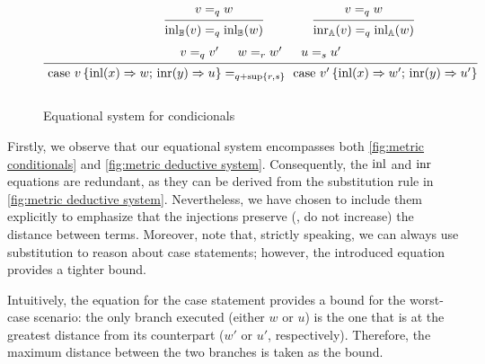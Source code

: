 \begin{figure}[H]
  \begin{equation*}
    \hspace{90pt}
            \begin{prooftree}
                    \hypo{ v =_q w}
                    \infer1[]{\inl_\typeB(v) =_q \inl_\typeB(w)}
            \end{prooftree}
            \hspace{40pt}
            \begin{prooftree}
                    \hypo{ v =_q w}
                    \infer1[]{\inr_\typeA(v) =_q \inl_\typeA(w)}
            \end{prooftree}
    \end{equation*}
    \begin{equation*}
    \hspace{20pt}
  \begin{aligned}
  \hspace{-20pt}
  \begin{prooftree}
      \hypo{ v =_{q} v' }
      \hypo{w=_{r} w'}
      \hypo{u=_{s}u'}
      \infer3[]{\text{ case } v \,   \{\text{inl} (x) \Rightarrow w ; \, \text{inr} (y) \Rightarrow u\} =_{q+\sup\{ r, s \}} \text{ case } v' \,  \{\text{inl} (x) \Rightarrow w' ; \,\text{inr} (y) \Rightarrow u'\} }
  \end{prooftree}
  \\[10pt]
  \end{aligned}
  \end{equation*}
  \caption{Equational system for condicionals}
  \label{fig:metric conditionals}
\end{figure}


Firstly, we observe that our equational system encompasses both \autoref{fig:metric conditionals} and \autoref{fig:metric deductive system}. Consequently, the $\mathrm{inl}$ and $\mathrm{inr}$ equations are redundant, as they can be derived from the substitution rule in \autoref{fig:metric deductive system}. Nevertheless, we have chosen to include them explicitly to emphasize that the injections preserve (\ie, do not increase) the distance between terms. Moreover, note that, strictly speaking, we can always use substitution to reason about case statements; however, the introduced equation provides a tighter bound.

 Intuitively, the equation for the case statement provides a bound for the worst-case scenario: the only branch executed (either $w$ or $u$) is the one that is at the greatest distance from its counterpart ($w'$ or $u'$, respectively). Therefore, the maximum distance between the two branches is taken as the bound.   

